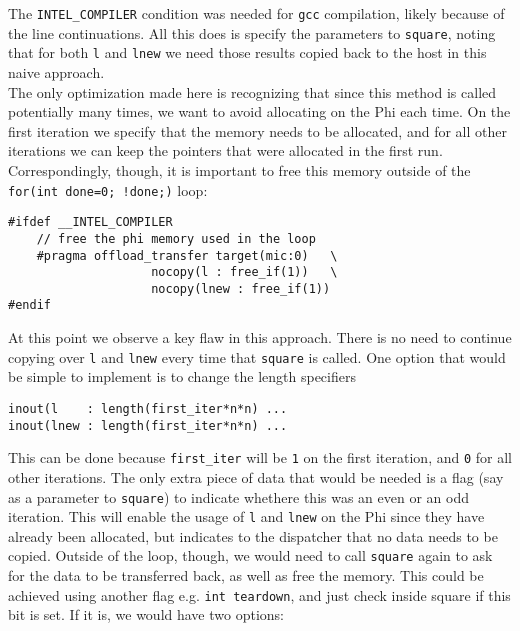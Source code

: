 \documentclass[11pt]{article}
\begin{document}
\noindent The \texttt{INTEL\_COMPILER} condition was needed for \texttt{gcc} compilation, likely because of the line continuations.  All this does is specify the parameters to \texttt{square}, noting that for both \texttt{l} and \texttt{lnew} we need those results copied back to the host in this naive approach.\\

\noindent The only optimization made here is recognizing that since this method is called potentially many times, we want to avoid allocating on the Phi each time.  On the first iteration we specify that the memory needs to be allocated, and for all other iterations we can keep the pointers that were allocated in the first run.  Correspondingly, though, it is important to free this memory outside of the \texttt{for(int done=0; !done;)} loop:

\begin{lstlisting}
#ifdef __INTEL_COMPILER
    // free the phi memory used in the loop
    #pragma offload_transfer target(mic:0)   \
                    nocopy(l : free_if(1))   \
                    nocopy(lnew : free_if(1))
#endif
\end{lstlisting}

\noindent At this point we observe a key flaw in this approach.  There is no need to continue copying over \texttt{l} and \texttt{lnew} every time that \texttt{square} is called.  One option that would be simple to implement is to change the length specifiers

\begin{lstlisting}
inout(l    : length(first_iter*n*n) ...
inout(lnew : length(first_iter*n*n) ...
\end{lstlisting}

\noindent This can be done because \texttt{first\_iter} will be \texttt{1} on the first iteration, and \texttt{0} for all other iterations.  The only extra piece of data that would be needed is a flag (say as a parameter to \texttt{square}) to indicate whethere this was an even or an odd iteration.  This will enable the usage of \texttt{l} and \texttt{lnew} on the Phi since they have already been allocated, but indicates to the dispatcher that no data needs to be copied.  Outside of the loop, though, we would need to call \texttt{square} again to ask for the data to be transferred back, as well as free the memory.  This could be achieved using another flag e.g. \texttt{int teardown}, and just check inside square if this bit is set.  If it is, we would have two options:
\end{document}

